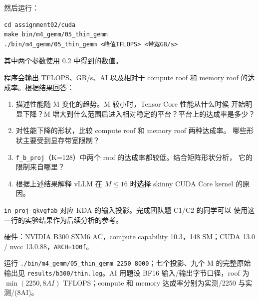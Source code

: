 \documentclass[11pt,a4paper,fontset=fandol]{ctexart}
\begin{document}
然后运行：

\begin{verbatim}
cd assignment02/cuda
make bin/m4_gemm/05_thin_gemm
./bin/m4_gemm/05_thin_gemm <峰值TFLOPS> <带宽GB/s>
\end{verbatim}

其中两个参数使用 0.2 中得到的数值。

程序会输出 TFLOPS、GB/s、AI 以及相对于 compute roof 和 memory roof
的达成率。根据结果回答：

\begin{enumerate}
\def\labelenumi{(\alph{enumi})}
\item
  描述性能随 M 变化的趋势。M 较小时，Tensor Core 性能从什么时候
  开始明显下降？M
  增大到什么范围后进入相对稳定的平台？平台上的达成率是多少？
\item
  对性能下降的形状，比较 compute roof 和 memory roof 两种达成率。
  哪些形状主要受到显存带宽限制？
\item
  \texttt{f\_\allowbreak{}b\_\allowbreak{}proj}（K=128）中两个 roof
  的达成率都较低。结合矩阵形状分析， 它的限制来自哪里？
\item
  根据上述结果解释 vLLM 在 \(M \le 16\) 时选择 skinny CUDA Core kernel
  的原因。
\end{enumerate}

\texttt{in\_\allowbreak{}proj\_\allowbreak{}qkvgfab} 对应 KDA
的输入投影。完成团队题 C1/C2 的同学可以
使用这一行的实验结果作为后续分析的参考。

\begin{answer}

硬件：NVIDIA B300 SXM6 AC，compute capability 10.3，148 SM；CUDA 13.0 /
nvcc 13.0.88，\texttt{ARCH=\allowbreak{}100f}。

运行
\texttt{.\allowbreak{}/\allowbreak{}bin/\allowbreak{}m4\_\allowbreak{}gemm/\allowbreak{}05\_\allowbreak{}thin\_\allowbreak{}gemm\ 2250\ 8000}；七个投影、九个
M 的完整原始输出见
\texttt{results/\allowbreak{}b300/\allowbreak{}thin.\allowbreak{}log}。AI
用题设 BF16 输入/输出字节口径，roof 为 \(\min(2250,8AI)\)
TFLOPS；compute 和 memory 达成率分别为实测/2250 与实测/(8AI)。

\end{answer}
\end{document}
